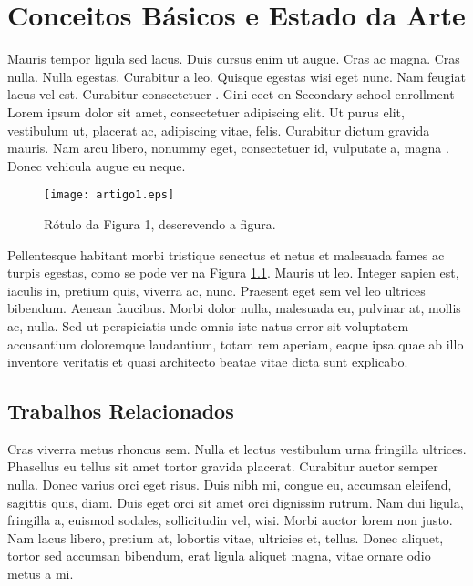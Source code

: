 %
%

\chapter{Conceitos B\'{a}sicos e Estado da Arte}
Mauris tempor ligula sed lacus. Duis cursus enim ut augue. Cras ac magna. Cras nulla. Nulla egestas. Curabitur a leo. Quisque egestas wisi eget nunc. Nam feugiat lacus vel est. Curabitur consectetuer \citep{Araujo2015}. Gini eect on Secondary school enrollment Lorem ipsum dolor sit amet, consectetuer adipiscing elit. Ut purus elit, vestibulum ut, placerat ac, adipiscing vitae, felis. Curabitur dictum gravida mauris. Nam arcu libero, nonummy eget, consectetuer id, vulputate a, magna \citep{Folha2015}. Donec vehicula augue eu neque.



\begin{figure}[!h]
	\centering
	\texttt{[image: artigo1.eps]}
	\caption{R\'{o}tulo da Figura 1, descrevendo a figura.}
	\label{fig:artigo1}
\end{figure}

Pellentesque habitant morbi tristique senectus et netus et malesuada fames ac turpis egestas, como se pode ver na Figura \ref{fig:artigo1}. Mauris ut leo. Integer sapien est, iaculis in, pretium quis, viverra ac, nunc. Praesent eget sem vel leo ultrices bibendum. Aenean faucibus. Morbi dolor nulla, malesuada eu, pulvinar at, mollis ac, nulla. Sed ut perspiciatis unde omnis iste natus error sit voluptatem accusantium doloremque laudantium, totam rem aperiam, eaque ipsa quae ab illo inventore veritatis et quasi architecto beatae vitae dicta sunt explicabo.

\section{Trabalhos Relacionados}
Cras viverra metus rhoncus sem. Nulla et lectus vestibulum urna fringilla ultrices. Phasellus eu tellus sit amet tortor gravida placerat. Curabitur auctor semper nulla. Donec varius orci eget risus. Duis nibh mi, congue eu, accumsan eleifend, sagittis quis, diam. Duis eget orci sit amet orci dignissim rutrum. Nam dui ligula, fringilla a, euismod sodales, sollicitudin vel, wisi. Morbi auctor lorem non justo. Nam lacus libero, pretium at, lobortis vitae, ultricies et, tellus. Donec aliquet, tortor sed accumsan bibendum, erat ligula aliquet magna, vitae ornare odio metus a mi.

